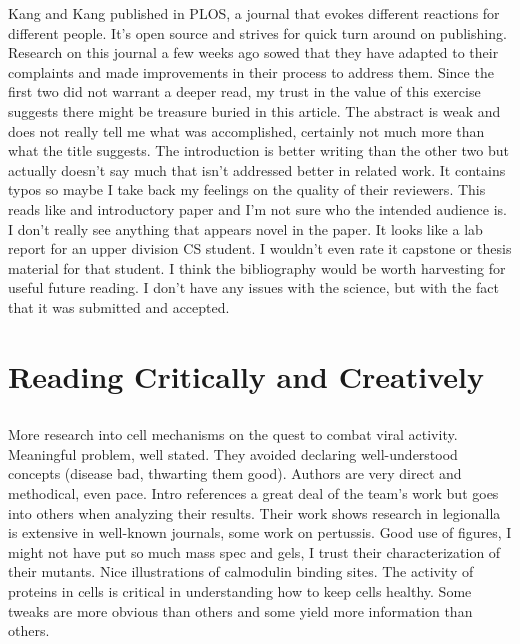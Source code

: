 \documentclass{article}
\begin{document}
Kang and Kang \cite{kang_ID_2016} published in PLOS, a journal that evokes different reactions for different people. It's open source and strives for quick turn around on publishing. Research on this journal a few weeks ago sowed that they have adapted to their complaints and made improvements in their process to address them. Since the first two did not warrant a deeper read, my trust in the value of this exercise suggests there might be treasure buried in this article. The abstract is weak and does not really tell me what was accomplished, certainly not much more than what the title suggests. The introduction is better writing than the other two but actually doesn't say much that isn't addressed better in related work. It contains typos so maybe I take back my feelings on the quality of their reviewers. This reads like and introductory paper and I'm not sure who the intended audience is. I don't really see anything that appears novel in the paper. It looks like a lab report for an upper division CS student. I wouldn't even rate it capstone or thesis material for that student. I think the bibliography would be worth harvesting for useful future reading. I don't have any issues with the science, but with the fact that it was submitted and accepted.
\section{Reading Critically and Creatively}
\subsection{}
\citeauthor{gan_regulation_2019} More research into cell mechanisms on the quest to combat viral activity. Meaningful problem, well stated. They avoided declaring well-understood concepts (disease bad, thwarting them good). Authors are very direct and methodical, even pace. Intro references a great deal of the team's work but goes into others when analyzing their results. Their work shows research in legionalla is extensive in well-known journals, some work on pertussis. Good use of figures, I might not have put so much mass spec and gels, I trust their characterization of their mutants. Nice illustrations of calmodulin binding sites. The activity of proteins in cells is critical in understanding how to keep cells healthy. Some tweaks are more obvious than others and some yield more information than others.
\end{document}
